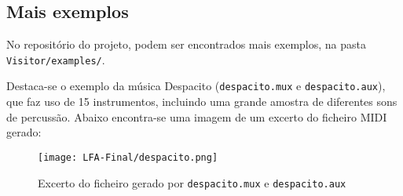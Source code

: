 \documentclass{article}
\begin{document}
\clearpage
\subsection{Mais exemplos}
No repositório do projeto, podem ser encontrados mais exemplos, na pasta \texttt{Visitor/examples/}.

Destaca-se o exemplo da música Despacito (\texttt{despacito.mux} e \texttt{despacito.aux}), que faz uso de 15 instrumentos, incluindo uma grande amostra de diferentes sons de percussão. Abaixo encontra-se uma imagem de um excerto do ficheiro MIDI gerado:

\begin{figure}[h]
    \center
    \texttt{[image: LFA-Final/despacito.png]}
    \caption{Excerto do ficheiro gerado por \texttt{despacito.mux} e \texttt{despacito.aux}}
    \label{fig:my_label}
\end{figure}
\end{document}
